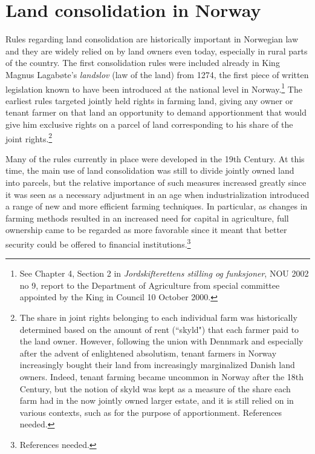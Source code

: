 \section{Land consolidation in Norway}\label{sec:2}

Rules regarding land consolidation are historically important in Norwegian law and they are widely relied on by land owners even today, especially in rural parts of the country. The first consolidation rules were included already in King Magnus Lagabøte's \emph{landslov} (law of the land) from 1274, the first piece of written legislation known to have been introduced at the national level in Norway.\footnote{See Chapter 4, Section 2 in \emph{Jordskifterettens stilling og funksjoner}, NOU 2002 no 9, report to the Department of Agriculture from special committee appointed by the King in Council 10 October 2000.} The earliest rules targeted jointly held rights in farming land, giving any owner or tenant farmer on that land an opportunity to demand apportionment that would give him exclusive rights on a parcel of land corresponding to his share of the joint rights.\footnote{The share in joint rights belonging to each individual farm was historically determined based on the amount of rent (``skyld") that each farmer paid to the land owner. However, following the union with Dennmark and especially after the advent of enlightened absolutism, tenant farmers in Norway increasingly bought their land from increasingly marginalized Danish land owners. Indeed, tenant farming became uncommon in Norway after the 18th Century, but the notion of skyld was kept as a measure of the share each farm had in the now jointly owned larger estate, and it is still relied on in various contexts, such as for the purpose of apportionment. References needed.}

Many of the rules currently in place were developed in the 19th Century. At this time, the main use of land consolidation was still to divide jointly owned land into parcels, but the relative importance of such measures increased greatly since it was seen as a necessary adjustment in an age when industrialization introduced a range of new and more efficient farming techniques. In particular, as changes in farming methods resulted in an increased need for capital in agriculture, full ownership came to be regarded as more favorable since it meant that better security could be offered to financial institutions.\footnote{References needed.} 

